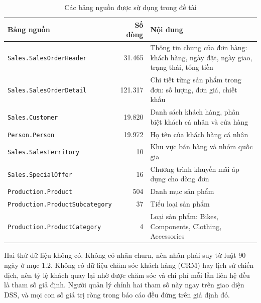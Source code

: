 \begin{table}[!htbp]
\centering\footnotesize
\caption{Các bảng nguồn được sử dụng trong đề tài}
\label{tab:bang_nguon}
\begin{tabular}{lr>{\raggedright\arraybackslash}p{7.8cm}}
\toprule
\textbf{Bảng nguồn} & \textbf{Số dòng} & \textbf{Nội dung} \\
\midrule
\texttt{Sales.SalesOrderHeader} & 31.465 & Thông tin chung của đơn hàng: khách hàng, ngày đặt, ngày giao, trạng thái, tổng tiền \\
\texttt{Sales.SalesOrderDetail} & 121.317 & Chi tiết từng sản phẩm trong đơn: số lượng, đơn giá, chiết khấu \\
\texttt{Sales.Customer} & 19.820 & Danh sách khách hàng, phân biệt khách cá nhân và cửa hàng \\
\texttt{Person.Person} & 19.972 & Họ tên của khách hàng cá nhân \\
\texttt{Sales.SalesTerritory} & 10 & Khu vực bán hàng và nhóm quốc gia \\
\texttt{Sales.SpecialOffer} & 16 & Chương trình khuyến mãi áp dụng cho dòng đơn \\
\texttt{Production.Product} & 504 & Danh mục sản phẩm \\
\texttt{Production.ProductSubcategory} & 37 & Tiểu loại sản phẩm \\
\texttt{Production.ProductCategory} & 4 & Loại sản phẩm: Bikes, Components, Clothing, Accessories \\
\bottomrule
\end{tabular}
\end{table}

Hai thứ dữ liệu không có. Không có nhãn churn, nên nhãn phải suy từ luật 90 ngày ở mục 1.2. Không có dữ liệu chăm sóc khách hàng (CRM) hay lịch sử chiến dịch, nên tỷ lệ khách quay lại nhờ được chăm sóc và chi phí mỗi lần liên hệ đều là tham số giả định. Người quản lý chỉnh hai tham số này ngay trên giao diện DSS, và mọi con số giá trị ròng trong báo cáo đều đứng trên giả định đó.
